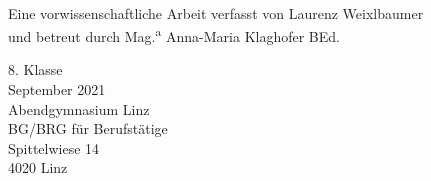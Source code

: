 \begin{titlepage}
    \centering%

    \setlength{\parindent}{0pt}%

    {\huge\textbf{\\\vspace{0.2cm}}}%

    \vspace{0.5cm}%

    {\large Eine vorwissenschaftliche Arbeit verfasst von Laurenz Weixlbaumer\\
    und betreut durch Mag.\textsuperscript{a} Anna-Maria Klaghofer BEd.}

    \vfill
    8. Klasse\\
    September 2021\\\vspace{0.5cm}
    Abendgymnasium Linz\\
    BG/BRG für Berufstätige\\
    Spittelwiese 14\\
    4020 Linz
    
\end{titlepage}

\clearpage\addtocounter{page}{1}
